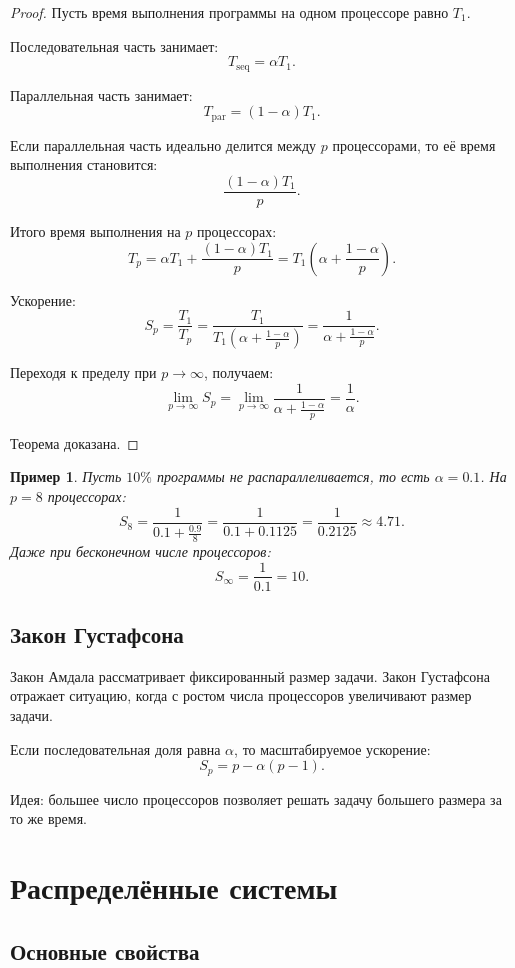 \documentclass[12pt,a4paper]{article}
\newtheorem{example}{Пример}
\begin{document}
\begin{proof}
Пусть время выполнения программы на одном процессоре равно $T_1$.

Последовательная часть занимает:
\[
T_{\text{seq}} = \alpha T_1.
\]

Параллельная часть занимает:
\[
T_{\text{par}} = (1-\alpha)T_1.
\]

Если параллельная часть идеально делится между $p$ процессорами, то её время выполнения становится:
\[
\frac{(1-\alpha)T_1}{p}.
\]

Итого время выполнения на $p$ процессорах:
\[
T_p = \alpha T_1 + \frac{(1-\alpha)T_1}{p}
= T_1\left(\alpha + \frac{1-\alpha}{p}\right).
\]

Ускорение:
\[
S_p = \frac{T_1}{T_p}
= \frac{T_1}{T_1\left(\alpha + \frac{1-\alpha}{p}\right)}
= \frac{1}{\alpha + \frac{1-\alpha}{p}}.
\]

Переходя к пределу при $p \to \infty$, получаем:
\[
\lim_{p\to\infty} S_p
=
\lim_{p\to\infty}
\frac{1}{\alpha + \frac{1-\alpha}{p}}
=
\frac{1}{\alpha}.
\]

Теорема доказана.
\end{proof}

\begin{example}
Пусть $10\%$ программы не распараллеливается, то есть $\alpha=0.1$.
На $p=8$ процессорах:
\[
S_8 = \frac{1}{0.1+\frac{0.9}{8}}
= \frac{1}{0.1+0.1125}
= \frac{1}{0.2125}
\approx 4.71.
\]
Даже при бесконечном числе процессоров:
\[
S_{\infty}=\frac{1}{0.1}=10.
\]
\end{example}

\subsection{Закон Густафсона}

Закон Амдала рассматривает фиксированный размер задачи. Закон Густафсона отражает ситуацию, когда с ростом числа процессоров увеличивают размер задачи.

Если последовательная доля равна $\alpha$, то масштабируемое ускорение:
\[
S_p = p - \alpha(p-1).
\]

Идея: большее число процессоров позволяет решать задачу большего размера за то же время.

\section{Распределённые системы}

\subsection{Основные свойства}
\end{document}
